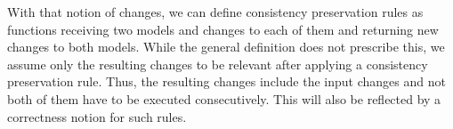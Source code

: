 
With that notion of changes, we can define consistency preservation rules as functions receiving two models and changes to each of them and returning new changes to both models.
While the general definition does not prescribe this, we assume only the resulting changes to be relevant after applying a consistency preservation rule.
Thus, the resulting changes include the input changes and not both of them have to be executed consecutively.
This will also be reflected by a correctness notion for such rules.

